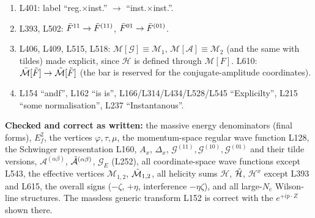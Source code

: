 \documentclass[9pt]{article}
\numberwithin{equation}{section}
\begin{document}
\begin{enumerate}
    \item L401: label ``reg.$\times$inst.'' $\rightarrow$ ``inst.$\times$inst.''.
    \item L393, L502: $\Bar{F}^{11}\rightarrow\Bar{F}^{(11)}$, $\Bar{F}^{01}\rightarrow\Bar{F}^{(01)}$.
    \item L406, L409, L515, L518: $\mathcal{M}[\mathcal{G}]\equiv\mathcal{M}_{1}$, $\mathcal{M}[\mathcal{A}]\equiv\mathcal{M}_{2}$ (and the same with tildes) made explicit, since $\mathcal{H}$ is defined through $\mathcal{M}[F]$. L610: $\Bar{\mathcal{M}}[\Tilde{F}]\rightarrow\Tilde{\mathcal{M}}[\Tilde{F}]$ (the bar is reserved for the conjugate-amplitude coordinates).
    \item L154 ``andf'', L162 ``is is'', L166/L314/L434/L528/L545 ``Explicilty'', L215 ``some normalisation'', L237 ``Instantanous''.
\end{enumerate}
\noindent\textbf{Checked and correct as written:} the massive energy denominators (final forms), $E^{2}_{f}$, the vertices $\varphi,\tau,\mu$, the momentum-space regular wave function L128, the Schwinger representation L160, $A_{x}$, $\Delta_{x}$, $\mathcal{G}^{(11)},\mathcal{G}^{(10)},\mathcal{G}^{(01)}$ and their tilde versions, $\mathcal{A}^{(\alpha\beta)}$, $\Tilde{\mathcal{A}}^{(\alpha\beta)}$, $\mathcal{G}_{E}$ (L252), all coordinate-space wave functions except L543, the effective vertices $\mathcal{M}_{1,2}$, $\Tilde{\mathcal{M}}_{1,2}$, all helicity sums $\mathcal{H}$, $\Tilde{\mathcal{H}}$, $\mathcal{H}^{x}$ except L393 and L615, the overall signs ($-\zeta$, $+\eta$, interference $-\eta\zeta$), and all large-$N_{c}$ Wilson-line structures. The massless generic transform L152 is correct with the $e^{+ip\cdot Z}$ shown there.
\end{document}
